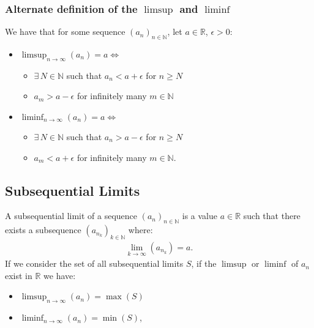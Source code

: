 \documentclass[a4paper, 12pt, twoside]{article}
\begin{document}
\newpage

\subsubsection{Alternate definition of the $\limsup$ and $\liminf$}

We have that for some sequence $(a_n)_{n \in \mathbb{N}}$, let
$a \in \mathbb{R}$, $\epsilon > 0$:

\begin{itemize}
      \item $\limsup_{n\to\infty}(a_n) = a \Leftrightarrow$ \begin{itemize}
                  \item $\exists \, N \in \mathbb{N}$ such that
                        $a_n < a + \epsilon$ for $n \geq N$
                  \item $a_m > a - \epsilon$ for infinitely many $m \in \mathbb{N}$
            \end{itemize}
      \item $\liminf_{n\to\infty}(a_n) = a \Leftrightarrow$ \begin{itemize}
                  \item $\exists \, N \in \mathbb{N}$ such that
                        $a_n > a - \epsilon$ for $n \geq N$
                  \item $a_m < a + \epsilon$ for infinitely many $m \in \mathbb{N}$.
            \end{itemize}
\end{itemize}

\subsection{Subsequential Limits}

A subsequential limit of a sequence $(a_n)_{n \in \mathbb{N}}$ is a value
$a \in \mathbb{R}$ such that there exists a subsequence
$(a_{n_k})_{k\in\mathbb{N}}$ where:
\begin{align*}
      \lim_{k\to\infty}(a_{n_k}) = a.
\end{align*}
If we consider the set of all subsequential limits $S$, if the $\limsup$ or
$\liminf$ of $a_n$ exist in $\mathbb{R}$ we have:

\begin{itemize}
      \item $\limsup_{n\to\infty}(a_n) = \max(S)$
      \item $\liminf_{n\to\infty}(a_n) = \min(S)$,
\end{itemize}
\end{document}
